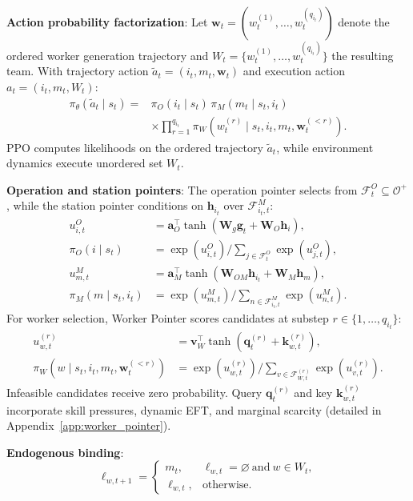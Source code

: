 \documentclass[journal,10pt]{IEEEtran}
\begin{document}
\textbf{Action probability factorization}:
Let $\mathbf w_t=(w_t^{(1)},\dots,w_t^{(q_{i_t})})$ denote the ordered worker generation trajectory and $W_t=\{w_t^{(1)},\dots,w_t^{(q_{i_t})}\}$ the resulting team. With trajectory action $\widetilde a_t=(i_t,m_t,\mathbf w_t)$ and execution action $a_t=(i_t,m_t,W_t)$:
\begin{equation}
\begin{aligned}
\pi_\theta(\widetilde a_t\mid s_t) ={}& \pi_O(i_t\mid s_t)\,\pi_M(m_t\mid s_t,i_t) \\
&\times \prod_{r=1}^{q_{i_t}}\pi_W\left(w_t^{(r)}\mid s_t,i_t,m_t,\mathbf w_t^{(<r)}\right).
\end{aligned}
\end{equation}
PPO computes likelihoods on the ordered trajectory $\widetilde a_t$, while environment dynamics execute unordered set $W_t$.

\textbf{Operation and station pointers}:
The operation pointer selects from $\mathcal{F}_t^O\subseteq\mathcal{O}^+$, while the station pointer conditions on $\mathbf{h}_{i_t}$ over $\mathcal{F}_{i_t,t}^M$:
\begin{align}
u_{i,t}^O &= \mathbf a_O^{\top}\tanh(\mathbf W_g\mathbf g_t + \mathbf W_O\mathbf h_i), \\
\pi_O(i\mid s_t) &= \exp(u_{i,t}^O)\Big/\textstyle\sum_{j\in\mathcal F_t^O}\exp(u_{j,t}^O), \\
u_{m,t}^M &= \mathbf a_M^{\top}\tanh(\mathbf W_{OM}\mathbf h_{i_t} + \mathbf W_M\mathbf h_m), \\
\pi_M(m\mid s_t,i_t) &= \exp(u_{m,t}^M)\Big/\textstyle\sum_{n\in\mathcal F_{i_t,t}^M}\exp(u_{n,t}^M).
\end{align}
For worker selection, Worker Pointer scores candidates at substep $r\in\{1,\dots,q_{i_t}\}$:
\begin{align}
u_{w,t}^{(r)} &= \mathbf v_W^{\top}\tanh\left(\mathbf q_t^{(r)} + \mathbf k_{w,t}^{(r)}\right), \\
\pi_W\left(w\mid s_t,i_t,m_t,\mathbf w_t^{(<r)}\right) &= \exp(u_{w,t}^{(r)})\Big/\textstyle\sum_{v\in\mathcal F_{W,t}^{(r)}}\exp(u_{v,t}^{(r)}).
\end{align}
Infeasible candidates receive zero probability. Query $\mathbf q_t^{(r)}$ and key $\mathbf k_{w,t}^{(r)}$ incorporate skill pressures, dynamic EFT, and marginal scarcity (detailed in Appendix~\ref{app:worker_pointer}).

\textbf{Endogenous binding}:
\begin{equation}
\ell_{w,t+1} = \begin{cases} m_t, & \ell_{w,t}=\varnothing \ \text{and}\ w\in W_t, \\ \ell_{w,t}, & \text{otherwise}. \end{cases}
\end{equation}
\end{document}
